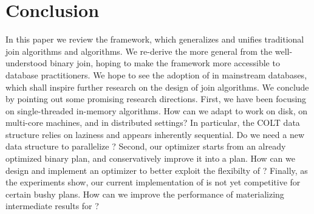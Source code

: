 \section{Conclusion}\label{sec:conclusion}
In this paper we review the \FJ framework,
which generalizes and unifies traditional join algorithms and \WCOJ algorithms.
We re-derive the more general \FJ from the well-understood binary join,
hoping to make the framework more accessible to database practitioners.
We hope to see the adoption of \FJ in mainstream databases,
which shall inspire further research on the design of join algorithms.
We conclude by pointing out some promising research directions.
First, we have been focusing on single-threaded in-memory algorithms.
How can we adapt \FJ to work on disk, on multi-core machines, and in distributed settings?
In particular, the COLT data structure relies on laziness and appears inherently sequential.
Do we need a new data structure to parallelize \FJ?
Second, our optimizer starts from an already optimized binary plan, and conservatively
improve it into a \FJ plan.
How can we design and implement an optimizer to better exploit the flexibilty of \FJ?
Finally, as the experiments show, our current implementation of \FJ is not yet competitive
for certain bushy plans.
How can we improve the performance of materializing intermediate results for \FJ?